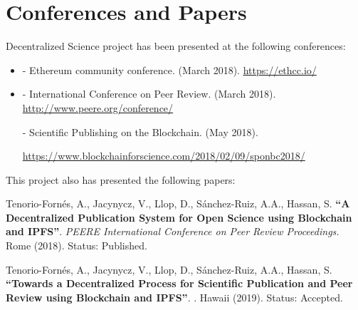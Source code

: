 \section{Conferences and Papers}
\label{sec:conferences-papers}

Decentralized Science project has been presented at the following conferences:

\begin{itemize}
\item {} - Ethereum community conference.  (March
  2018). \url{https://ethcc.io/}

\item {} - International Conference on Peer Review. 
  (March 2018). \url{http://www.peere.org/conference/}

   - Scientific Publishing on the Blockchain.  (May 2018).
  
  
  \url{https://www.blockchainforscience.com/2018/02/09/sponbc2018/}
\end{itemize}

This project also has presented the following papers:

\begin{minipage}{\linewidth}
  Tenorio-Fornés, A., Jacynycz, V., Llop, D., Sánchez-Ruiz, A.A., Hassan, S.
  \textbf{``A Decentralized Publication System for Open Science using Blockchain
    and IPFS''}. \emph{PEERE International Conference on Peer Review
    Proceedings.} Rome (2018). Status: Published.
\end{minipage}

\vspace{5mm}

\begin{minipage}{\linewidth}
  Tenorio-Fornés, A., Jacynycz, V., Llop, D., Sánchez-Ruiz, A.A., Hassan, S.
  \textbf{``Towards a Decentralized Process for Scientific Publication and Peer
    Review using Blockchain and IPFS''}. . Hawaii (2019). Status: Accepted.
\end{minipage}


\cleardoublepage





